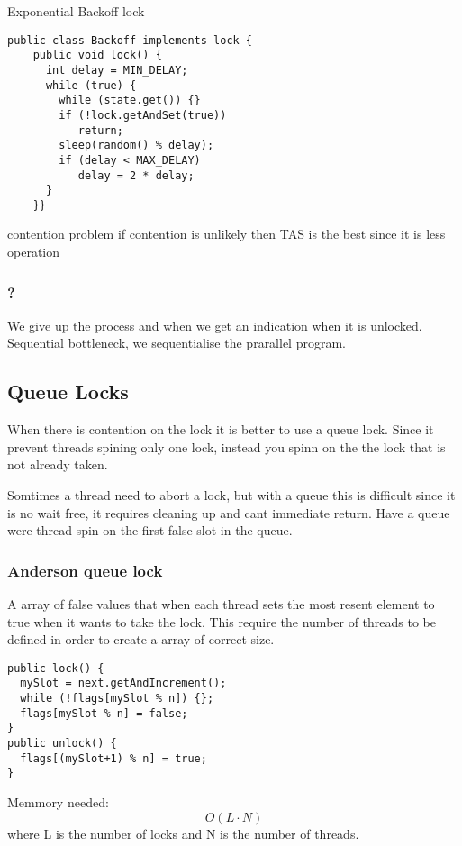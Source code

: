 Exponential Backoff lock

\begin{BVerbatim}[baseline=c]
  public class Backoff implements lock {
    public void lock() {
      int delay = MIN_DELAY;
      while (true) {
        while (state.get()) {}
        if (!lock.getAndSet(true))
           return;
        sleep(random() %
        if (delay < MAX_DELAY)
           delay = 2 * delay;
      }
    }}
\end{BVerbatim}

contention problem
if contention is unlikely then TAS is the best since it is less operation

\subsubsection{?}
We give up the process and when we get an indication when it is unlocked.
Sequential bottleneck, we sequentialise the prarallel program.


\subsection{Queue Locks}
When there is contention on the lock it is better to use a queue lock.
Since it prevent threads spining only one lock, instead you spinn on the
the lock that is not already taken.

Somtimes a thread need to abort a lock, but with a queue this is difficult since
it is no wait free, it requires cleaning up and cant immediate return.
Have a queue were thread spin on the first false slot in the queue.

\subsubsection{Anderson queue lock}
A array of false values that when each thread sets the most resent element
to true when it wants to take the lock. This require the number of threads
to be defined in order to create a array of correct size.

\begin{BVerbatim}[baseline=c]
public lock() {
  mySlot = next.getAndIncrement();
  while (!flags[mySlot %
  flags[mySlot %
}
public unlock() {
  flags[(mySlot+1) %
}
\end{BVerbatim}
Memmory needed:
\begin{equation}
  O(L\cdot N)
\end{equation}
where L is the number of locks and N is the number of threads.



